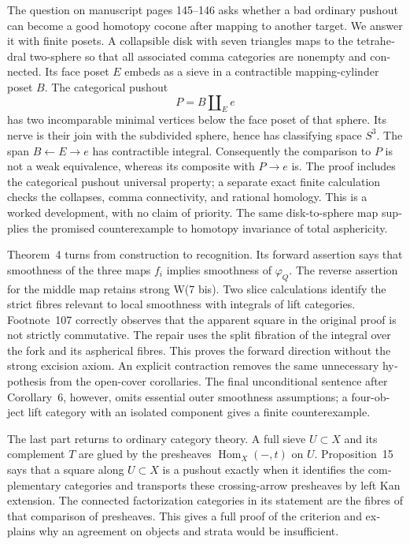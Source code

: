 \begin{otherlanguage}{english}
The question on manuscript pages 145--146 asks whether a bad ordinary pushout can become a good homotopy cocone after mapping to another target. We answer it with finite posets. A collapsible disk with seven triangles maps to the tetrahedral two-sphere so that all associated comma categories are nonempty and connected. Its face poset $E$ embeds as a sieve in a contractible mapping-cylinder poset $B$. The categorical pushout
\[
                         P=B\amalg_E e
\]
has two incomparable minimal vertices below the face poset of that sphere. Its nerve is their join with the subdivided sphere, hence has classifying space $S^3$. The span $B\leftarrow E\to e$ has contractible integral. Consequently the comparison to $P$ is not a weak equivalence, whereas its composite with $P\to e$ is. The proof includes the categorical pushout universal property; a separate exact finite calculation checks the collapses, comma connectivity, and rational homology. This is a worked development, with no claim of priority. The same disk-to-sphere map supplies the promised counterexample to homotopy invariance of total asphericity.

Theorem~4 turns from construction to recognition. Its forward assertion says that smoothness of the three maps $f_i$ implies smoothness of $\varphi_Q$. The reverse assertion for the middle map retains strong W(7 bis). Two slice calculations identify the strict fibres relevant to local smoothness with integrals of lift categories. Footnote~107 correctly observes that the apparent square in the original proof is not strictly commutative. The repair uses the split fibration of the integral over the fork and its aspherical fibres. This proves the forward direction without the strong excision axiom. An explicit contraction removes the same unnecessary hypothesis from the open-cover corollaries. The final unconditional sentence after Corollary~6, however, omits essential outer smoothness assumptions; a four-object lift category with an isolated component gives a finite counterexample.

The last part returns to ordinary category theory. A full sieve $U\subset X$ and its complement $T$ are glued by the presheaves $\operatorname{Hom}_X(-,t)$ on $U$. Proposition~15 says that a square along $U\subset X$ is a pushout exactly when it identifies the complementary categories and transports these crossing-arrow presheaves by left Kan extension. The connected factorization categories in its statement are the fibres of that comparison of presheaves. This gives a full proof of the criterion and explains why an agreement on objects and strata would be insufficient.


\end{otherlanguage}
